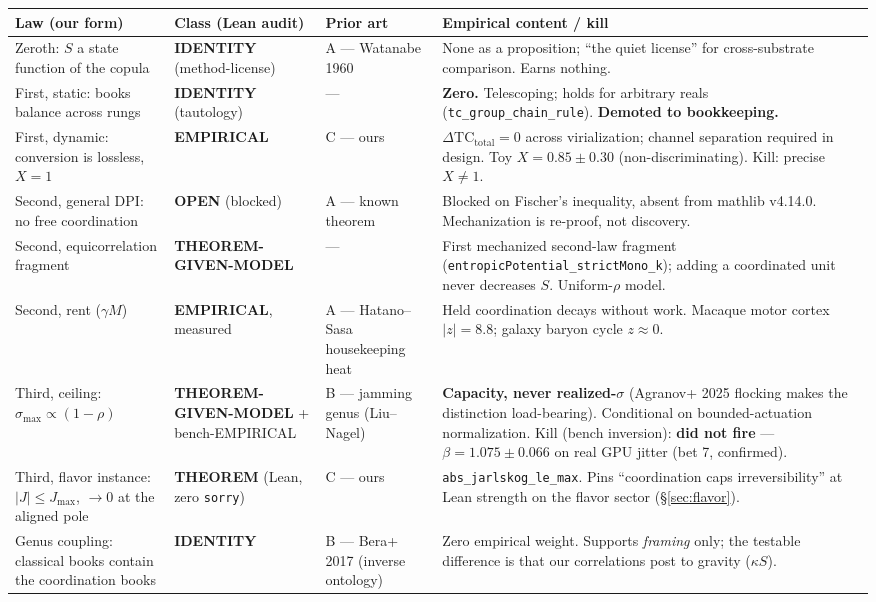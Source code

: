 \documentclass[11pt,a4paper]{article}
\begin{document}
\begin{center}
\small
\renewcommand{\arraystretch}{1.25}
\begin{tabular}{@{}p{2.6cm}p{3.5cm}p{3.0cm}p{4.2cm}@{}}
\toprule
\textbf{Law (our form)} & \textbf{Class (Lean audit)} & \textbf{Prior art} & \textbf{Empirical content / kill} \\
\midrule
Zeroth: $S$ a state function of the copula & \textbf{IDENTITY} (method-license) & A --- Watanabe 1960 & None as a proposition; ``the quiet license'' for cross-substrate comparison. Earns nothing. \\
First, static: books balance across rungs & \textbf{IDENTITY} (tautology) & --- & \textbf{Zero.} Telescoping; holds for arbitrary reals (\texttt{tc\_group\_chain\_rule}). \textbf{Demoted to bookkeeping.} \\
First, dynamic: conversion is lossless, $X=1$ & \textbf{EMPIRICAL} & C --- ours & $\Delta\mathrm{TC}_{\text{total}}=0$ across virialization; channel separation required in design. Toy $X = 0.85 \pm 0.30$ (non-discriminating). Kill: precise $X \ne 1$. \\
Second, general DPI: no free coordination & \textbf{OPEN} (blocked) & A --- known theorem & Blocked on Fischer's inequality, absent from mathlib v4.14.0. Mechanization is re-proof, not discovery. \\
Second, equicorrelation fragment & \textbf{THEOREM-GIVEN-MODEL} & --- & First mechanized second-law fragment (\texttt{entropicPotential\_strictMono\_k}); adding a coordinated unit never decreases $S$. Uniform-$\rho$ model. \\
Second, rent ($\gamma M$) & \textbf{EMPIRICAL}, measured & A --- Hatano--Sasa housekeeping heat & Held coordination decays without work. Macaque motor cortex $|z| = 8.8$; galaxy baryon cycle $z \approx 0$. \\
Third, ceiling: $\sigma_{\max} \propto (1-\rho)$ & \textbf{THEOREM-GIVEN-MODEL} + bench-EMPIRICAL & B --- jamming genus (Liu--Nagel) & \textbf{Capacity, never realized-$\sigma$} (Agranov+ 2025 flocking makes the distinction load-bearing). Conditional on bounded-actuation normalization. Kill (bench inversion): \textbf{did not fire} --- $\beta = 1.075 \pm 0.066$ on real GPU jitter (bet 7, confirmed). \\
Third, flavor instance: $|J| \le J_{\max}$, $\to 0$ at the aligned pole & \textbf{THEOREM} (Lean, zero \texttt{sorry}) & C --- ours & \texttt{abs\_jarlskog\_le\_max}. Pins ``coordination caps irreversibility'' at Lean strength on the flavor sector (\S\ref{sec:flavor}). \\
Genus coupling: classical books contain the coordination books & \textbf{IDENTITY} & B --- Bera+ 2017 (inverse ontology) & Zero empirical weight. Supports \emph{framing} only; the testable difference is that our correlations post to gravity ($\kappa S$). \\
\bottomrule
\end{tabular}
\end{center}
\end{document}
